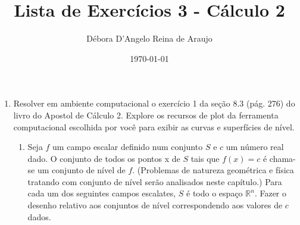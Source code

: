 \documentclass{article}
\begin{document}
\title{Lista de Exercícios 3 - Cálculo 2}
\author{Débora D'Angelo Reina de Araujo}
\date{\today}

\maketitle

\begin{enumerate}
    \item Resolver em ambiente computacional o exercício 1 da seção 8.3 (pág. 276) do livro do Apostol de Cálculo 2. Explore os recursos de plot da ferramenta computacional escolhida por você para exibir as curvas e superfícies de nível.
    
    \begin{enumerate}[label=1.\arabic*.]
        \item Seja $f$ um campo escalar definido num conjunto $S$ e $c$ um número real dado. 
        O conjunto de todos os pontos x de $S$ tais que $f(x) = c$ é chama-se um conjunto de nível de $f$. 
        (Problemas de natureza geométrica e física tratando com conjunto de nível serão analisados neste capítulo.) 
        Para cada um dos seguintes campos escalates, $S$ é todo o espaço $\mathbb{R}^{n}$. 
        Fazer o desenho relativo aos conjuntos de nível correspondendo aos valores de $c$ dados.


\end{enumerate}
\end{enumerate}
\end{document}

